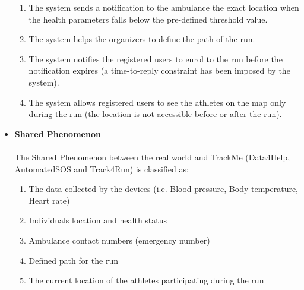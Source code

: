 \documentclass[12pt]{article}
\begin{document}
\begin{itemize}
\begin{enumerate}
\item{} The system sends a notification to the ambulance the exact location when the health parameters falls below the pre-defined threshold value.
\item{} The system helps the organizers to define the path of the run.
\item{} The system notifies the registered users to enrol to the run before the notification expires (a time-to-reply constraint has been imposed by the system).
\item{} The system allows registered users to see the athletes on the map only during the run (the location is not accessible before or after the run).
\end{enumerate}
\item \textbf{Shared Phenomenon}
\\
\\
The Shared Phenomenon between the real world and TrackMe (Data4Help, AutomatedSOS and Track4Run) is classified as:
\begin{enumerate}
\item{} The data collected by the devices (i.e. Blood pressure, Body temperature, Heart rate)
\item{} Individuals location and health status
\item{} Ambulance contact numbers (emergency number)
\item{} Defined path for the run
\item{} The current location of the athletes participating during the run
\end{enumerate}
\end{itemize}
\end{document}
